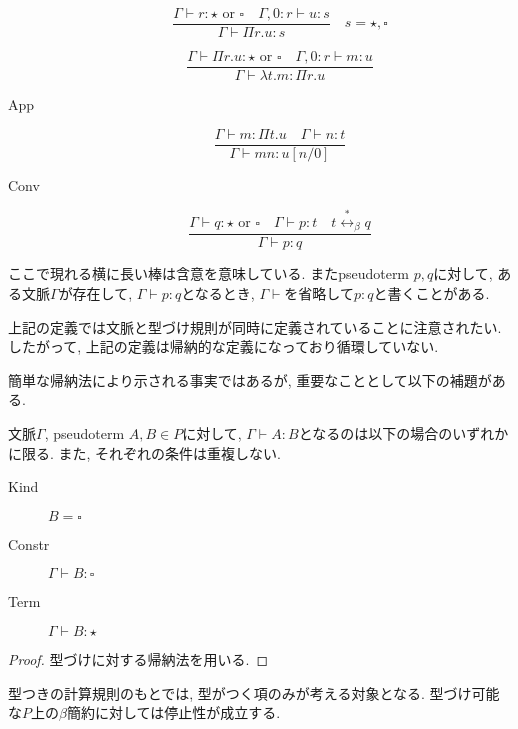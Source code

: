 \documentclass{ltjsarticle}
\begin{document}
\begin{defn}
\begin{description}
  \item[\Pi] \[ \frac{\Gamma \vdash r {\colon} {\star} \text{ or } {\square} \quad \Gamma, 0 {\colon} r \vdash u {\colon} s}{\Gamma \vdash \Pi r. u {\colon} s} 
             \quad
             s = {\star}, {\square} \]
  \item[\lambda] \[ \frac{\Gamma \vdash \Pi r. u {\colon} {\star} \text{ or } {\square} \quad \Gamma, 0 : r \vdash m : u}{\Gamma \vdash \lambda t. m {\colon} \Pi r. u} \]
  \item[App] \[ \frac{\Gamma \vdash m : \Pi t. u \quad \Gamma \vdash n : t}{\Gamma \vdash m n {\colon} u[n/0]} \]
  \item[Conv] \[\frac{\Gamma \vdash q {\colon} {\star} \text{ or } {\square} \quad \Gamma \vdash p {\colon} t \quad t \overset{*}{\leftrightarrow}_\beta q}{\Gamma \vdash p {\colon} q} \]
 \end{description}
 ここで現れる横に長い棒は含意を意味している. またpseudoterm $p, q$に対して, ある文脈$\Gamma$が存在して, $\Gamma \vdash p : q$となるとき, $\Gamma \vdash$を省略して$p : q$と書くことがある.
\end{defn}

\begin{rem}
 上記の定義では文脈と型づけ規則が同時に定義されていることに注意されたい. したがって, 上記の定義は帰納的な定義になっており循環していない.
\end{rem}

簡単な帰納法により示される事実ではあるが, 重要なこととして以下の補題がある.

\begin{lem}[Classification]
 文脈$\Gamma$, pseudoterm $A, B \in P$に対して, $\Gamma \vdash A \colon B$となるのは以下の場合のいずれかに限る. また, それぞれの条件は重複しない.
 \begin{description}
  \item[Kind] $B = \square$
  \item[Constr] $\Gamma \vdash B {\colon} {\square}$
  \item[Term] $\Gamma \vdash B {\colon} {\star}$
 \end{description}
\end{lem}
\begin{proof}
 型づけに対する帰納法を用いる.
\end{proof}

型つきの計算規則のもとでは, 型がつく項のみが考える対象となる. 型づけ可能な$P$上の$\beta$簡約に対しては停止性が成立する.

\end{document}
